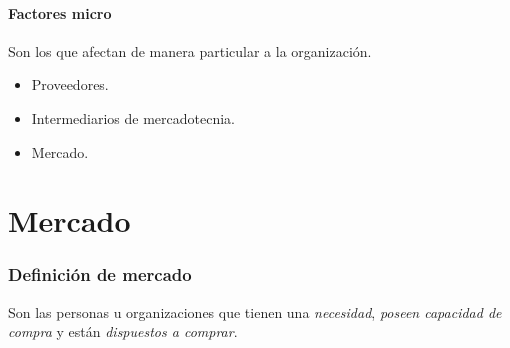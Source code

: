 \documentclass[9pt, spanish, a5paper]{article}
\begin{document}
\subsection{Factores micro}

Son los que afectan de manera particular a la organización.

\begin{itemize}
	\item Proveedores.
	\item Intermediarios de mercadotecnia.
	\item Mercado.
\end{itemize}


\part{Mercado}


\section{Definición de mercado}
Son las personas u organizaciones que tienen una \emph{necesidad}, \emph{poseen capacidad de compra} y están \emph{dispuestos a comprar}.
\end{document}
